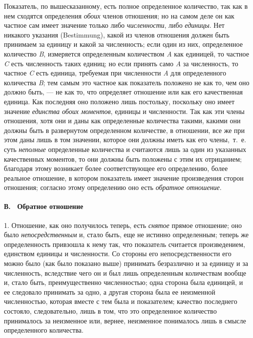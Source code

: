 Показатель, по вышесказанному, есть полное определенное количество, так как
в нем сходятся определения {\em обоих} членов
отношения; но на самом деле он как частное сам имеет значение только либо
{\em численности}, либо
{\em единицы}. Нет никакого указания (Bestimmung),
какой из членов отношения должен быть принимаем за единицу и какой за
численность; если один из них, определенное количество
{\em B}, измеряется определенным количеством
{\em A} как единицей, то частное
{\em C} есть численность таких единиц; но если принять
само {\em A} за численность, то частное
{\em C} есть единица, требуемая при численности
{\em A} для определенного количества
{\em B}; тем самым это частное как показатель положено
не как то, чем оно должно быть, — не как то, что определяет отношение или
как его качественная единица. Как последняя оно положено лишь постольку,
поскольку оно имеет значение {\em единства обоих
моментов}, единицы и численности. Так как эти члены отношения, хотя они и
даны как определенные количества такими, какими они должны быть в
развернутом определенном количестве, в отношении, все же при этом даны лишь
в том значении, которое они должны иметь как его члены,~т.~е. суть
{\em неполные} определенные количества и считаются лишь
за один из указанных качественных моментов, то они должны быть положены с
этим их отрицанием; благодаря этому возникает более соответствующее его
определению, более реальное отношение, в котором показатель имеет значение
произведения сторон отношения; согласно этому определению оно есть
{\em обратное отношение}.

\paragraph[В. \ Обратное отношение]{В. \ Обратное отношение}
\hypertarget{Toc478978667}{}1. Отношение, как оно получилось теперь, есть
{\em снятое} прямое отношение; оно было
{\em непосредственным} и, стало быть, еще не истинно
определенным; теперь же определенность привзошла к нему так, что показатель
считается произведением, единством единицы и численности. Со стороны его
непосредственности его можно было (как было показано выше) принимать
безразлично и за единицу и за численность, вследствие чего он и был лишь
определенным количествам вообще и, стало быть, преимущественно
численностью; одна сторона была единицей, и ее следовало принимать за одно,
а другая сторона была ее неизменной численностью, которая вместе с тем была
и показателем; качество последнего состояло, следовательно, лишь в том, что
это определенное количество принималось за неизменное или, вернее,
неизменное понималось лишь в смысле определенного количества.

